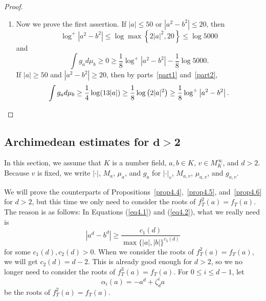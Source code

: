 \documentclass[11pt]{amsart}
\numberwithin{equation}{section}
\theoremstyle{plain}
\theoremstyle{definition}
\theoremstyle{remark}
\begin{document}
\begin{proof}
\begin{enumerate}[wide]
Suppose the claim is false; then for each $i$, there exists a $k_{i}$ such that
\[
\left|\alpha_{k_{i}}(a)-\alpha_{i}(b)\right|<5/|a|+5/|b|.
\]
If $k_{i}=k_{j}$ for some $i\neq j$, then
\[
1\leq|\alpha_{i}(b)-\alpha_{j}(b)|\leq|\alpha_{k_{i}}(a)-\alpha_{i}(b)|+|\alpha_{k_{j}}(a)-\alpha_{j}(b)|<10/|a|+10/|b|,
\]
and we have a contradiction. If $k_{i}\neq k_{j}$ for any $i\neq j$, then
\[
4\left|a^{2}-b^{2}\right|=\left|\sum_{i=1}^{4}\alpha_{i}(a)-\sum_{i=1}^{4}\alpha_{i}(b)\right|\leq\sum_{i=1}^{4}|\alpha_{k_{i}}(a)-\alpha_{i}(b)|<20/|a|+20/|b|.
\]
This also gives a contradiction because
\[
\frac{|a|}{|b|}\leq\left(\left|\frac{a^{2}}{b^{2}}-1\right|+1\right)^{1/2}=\left(\frac{\left|a^{2}-b^{2}\right|}{|b|^{2}}+1\right)^{1/2}\leq\left(\frac{20}{28^{2}}+1\right)^{1/2}\leq\frac{6}{5}
\]
and
\[
\left|a^{2}-b^{2}\right|\geq11/|a|\geq5/|a|+5/|b|.
\]
Therefore, the claim is proved and, by Proposition~\ref{prop4.5},
\[
\int g_{a}d\mu_{b}\geq\frac{1}{4}\cdot\frac{1}{4}\log(13|a|)=\frac{1}{16}\log(13|a|).
\]

\item\label{part4}
Now we prove the first assertion. If $|a|\leq50$ or $|a^{2}-b^{2}|\leq20$,
then
\[
\log^{+}\left|a^{2}-b^{2}\right|\leq\log\max\left\{2|a|^{2},20\right\}\leq\log5000
\]
and
\[
\int g_{a}d\mu_{b}\geq0\geq\frac{1}{8}\log^{+}\left|a^{2}-b^{2}\right|-\frac{1}{8}\log5000.
\]
If $|a|\geq50$ and $|a^{2}-b^{2}|\geq20$, then by parts~\eqref{part1} and~\eqref{part2},
\[
\int g_{a}d\mu_{b}\geq\frac{1}{4}\log(13|a|)\geq\frac{1}{8}\log\left(2|a|^{2}\right)\geq\frac{1}{8}\log^{+}\left|a^{2}-b^{2}\right|.\qedhere
\]
\end{enumerate}
\end{proof}

\subsection{Archimedean estimates for \texorpdfstring{$\boldsymbol{d>2}$}{$d>2$}}\label{sec4.3}

In this section, we assume that $K$ is a number field, $a,b\in K$,
$v\in M_{K}^{\infty}$, and $d>2$. Because $v$ is fixed, we write
$|\cdot|$, $M_{a}$, $\mu_{a}$, and $g_{a}$ for $|\cdot|_{v}$,
$M_{a,v}$, $\mu_{a,v}$, and $g_{a,v}$.

We will prove the counterparts of Propositions~\ref{prop4.4},~\ref{prop4.5},
and~\ref{prop4.6} for $d>2$, but this time we only need to consider
the roots of $f_{T}^{2}(a)=f_{T}(a)$. The reason is as follows: In
Equations (\ref{eq4.1}) and (\ref{eq4.2}), what we really need
is
\[
|a^{d}-b^{d}|\geq\frac{c_{1}(d)}{\max\{|a|,|b|\}^{c_{2}(d)}}
\]
for some $c_{1}(d),c_{2}(d)>0$. When we consider the roots of $f_{T}^{2}(a)=f_{T}(a)$,
we will get $c_{2}(d)=d-2$. This is already good enough for $d>2$,
so we no longer need to consider the roots of $f_{T}^{3}(a)=f_{T}(a)$.
For $0\leq i\leq d-1$, let
\[
\alpha_{i}(a)=-a^{d}+\zeta_{d}^{i}a
\]
be the roots of $f_{T}^{2}(a)=f_{T}(a)$.
\end{document}
